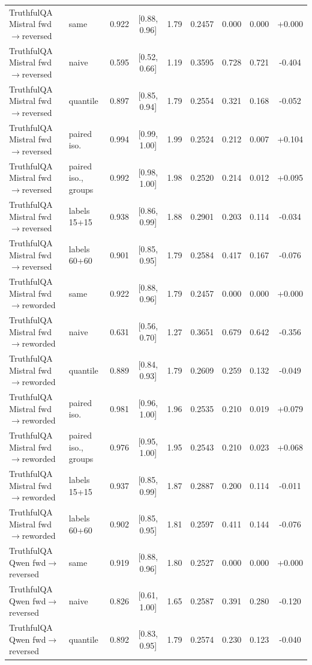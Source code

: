 \documentclass[11pt]{article}
\theoremstyle{definition}
\theoremstyle{remark}
\newcommand{\1}{\mathbf{1}}
\begin{document}
\begin{center}
\begin{tabular}{llccccccc}
\midrule
TruthfulQA Mistral fwd$\to$reversed & same & 0.922 & [0.88, 0.96] & 1.79 & 0.2457 & 0.000 & 0.000 & +0.000\\
TruthfulQA Mistral fwd$\to$reversed & naive & 0.595 & [0.52, 0.66] & 1.19 & 0.3595 & 0.728 & 0.721 & -0.404\\
TruthfulQA Mistral fwd$\to$reversed & quantile & 0.897 & [0.85, 0.94] & 1.79 & 0.2554 & 0.321 & 0.168 & -0.052\\
TruthfulQA Mistral fwd$\to$reversed & paired iso. & 0.994 & [0.99, 1.00] & 1.99 & 0.2524 & 0.212 & 0.007 & +0.104\\
TruthfulQA Mistral fwd$\to$reversed & paired iso., groups & 0.992 & [0.98, 1.00] & 1.98 & 0.2520 & 0.214 & 0.012 & +0.095\\
TruthfulQA Mistral fwd$\to$reversed & labels 15+15 & 0.938 & [0.86, 0.99] & 1.88 & 0.2901 & 0.203 & 0.114 & -0.034\\
TruthfulQA Mistral fwd$\to$reversed & labels 60+60 & 0.901 & [0.85, 0.95] & 1.79 & 0.2584 & 0.417 & 0.167 & -0.076\\
\midrule
TruthfulQA Mistral fwd$\to$reworded & same & 0.922 & [0.88, 0.96] & 1.79 & 0.2457 & 0.000 & 0.000 & +0.000\\
TruthfulQA Mistral fwd$\to$reworded & naive & 0.631 & [0.56, 0.70] & 1.27 & 0.3651 & 0.679 & 0.642 & -0.356\\
TruthfulQA Mistral fwd$\to$reworded & quantile & 0.889 & [0.84, 0.93] & 1.79 & 0.2609 & 0.259 & 0.132 & -0.049\\
TruthfulQA Mistral fwd$\to$reworded & paired iso. & 0.981 & [0.96, 1.00] & 1.96 & 0.2535 & 0.210 & 0.019 & +0.079\\
TruthfulQA Mistral fwd$\to$reworded & paired iso., groups & 0.976 & [0.95, 1.00] & 1.95 & 0.2543 & 0.210 & 0.023 & +0.068\\
TruthfulQA Mistral fwd$\to$reworded & labels 15+15 & 0.937 & [0.85, 0.99] & 1.87 & 0.2887 & 0.200 & 0.114 & -0.011\\
TruthfulQA Mistral fwd$\to$reworded & labels 60+60 & 0.902 & [0.85, 0.95] & 1.81 & 0.2597 & 0.411 & 0.144 & -0.076\\
\midrule
TruthfulQA Qwen fwd$\to$reversed & same & 0.919 & [0.88, 0.96] & 1.80 & 0.2527 & 0.000 & 0.000 & +0.000\\
TruthfulQA Qwen fwd$\to$reversed & naive & 0.826 & [0.61, 1.00] & 1.65 & 0.2587 & 0.391 & 0.280 & -0.120\\
TruthfulQA Qwen fwd$\to$reversed & quantile & 0.892 & [0.83, 0.95] & 1.79 & 0.2574 & 0.230 & 0.123 & -0.040\\

\end{tabular}
\end{center}
\end{document}
